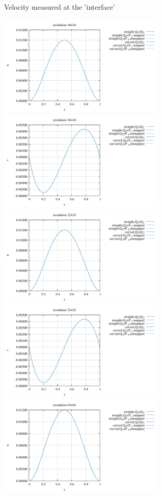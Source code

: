 \newpage
Velocity measured at the 'interface'
\begin{center}
\includegraphics[width=8cm]{python_codes/fieldstone_25/results/doneahuerta/interface_u_16.pdf}
\includegraphics[width=8cm]{python_codes/fieldstone_25/results/doneahuerta/interface_v_16.pdf}\\
\includegraphics[width=8cm]{python_codes/fieldstone_25/results/doneahuerta/interface_u_32.pdf}
\includegraphics[width=8cm]{python_codes/fieldstone_25/results/doneahuerta/interface_v_32.pdf}\\
\includegraphics[width=8cm]{python_codes/fieldstone_25/results/doneahuerta/interface_u_64.pdf}

\end{center}
